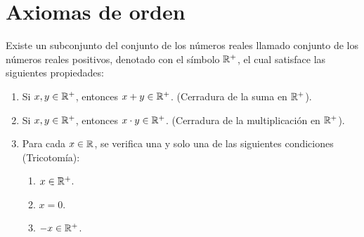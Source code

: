 \part*{Axiomas de orden}

%
Existe un subconjunto del conjunto de los números reales llamado conjunto de los números reales positivos, denotado con el símbolo $\mathbb{R}^+$, el cual satisface las siguientes propiedades:%
\vspace{-1em} \begin{enumerate}[start=12]%
\item Si $x, y \in \mathbb{R}^+$, entonces $x + y \in \mathbb{R}^+$. (Cerradura de la suma en $\mathbb{R}^+$).
\item Si $x, y \in \mathbb{R}^+$, entonces $x \cdot y \in \mathbb{R}^+$. (Cerradura de la multiplicación en $\mathbb{R}^+$).
\item Para cada $x\in \mathbb{R}$, se verifica una y solo una de las siguientes condiciones (Tricotomía):
\begin{enumerate}[label=\roman*)]
\item $x \in \mathbb{R}^+$.
\item $x = 0$.
\item $-x \in \mathbb{R}^+$.
\end{enumerate}
\end{enumerate}

